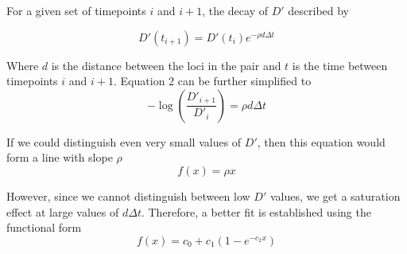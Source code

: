 \documentclass[12pt]{article}
\begin{document}
\noindent For a given set of timepoints $i$ and $i+1$, the decay of $D'$ described by

\begin{equation}
D'(t_{i+1}) =  D'(t_i)  e^{-\rho d \Delta t}
\end{equation}

\noindent Where $d$ is the distance between the loci in the pair and $t$ is the time between timepoints $i$ and $i+1$. Equation 2 can be further simplified to
\begin{equation}
-\log \left(\frac{D'_{i+1}}{D'_i}\right) = \rho d \Delta t
\end{equation}

If we could distinguish even very small values of $D'$, then this equation would form a line with slope $\rho$
\[f(x) = \rho x\]

However, since we cannot distinguish between low $D'$ values, we get a saturation effect at large values of $d \Delta t$. Therefore, a better fit is established using the functional form
\[f(x) = c_0 + c_1(1-e^{-c_2 x})\]
\end{document}
